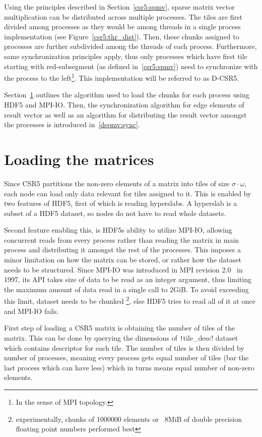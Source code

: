 \documentclass[thesis=M,english]{FITthesis}[2019/12/23]
\newcommand{\csre}[1]{\texttt!#1!}
\begin{document}
Using the principles described in Section~\ref{csr5:spmv}, sparse matrix vector multiplication can be
distributed across multiple processes. The tiles are first divided among processes as they would be
among threads in a single process implementation (see Figure~\ref{csr5:thr_dist}). Then, these chunks
assigned to processes are further subdivided among the threads of each process. Furthermore, same
synchronization principles apply, thus only processes which have first tile starting with red-subsegment
(as defined in~\ref{csr5:spmv}) need to synchronize with the process to the
left\footnote{In the sense of MPI topology.}. This implementation will be referred to as D-CSR5.

Section~\ref{dspmv:load} outlines the algorithm used to load the chunks for each process using HDF5 and
MPI-IO. Then, the synchronization algorithm for edge elements of result vector as well as an algorithm for
distributing the result vector amongst the processes is introduced in~\ref{dspmv:sync}.



\section{Loading the matrices}\label{dspmv:load}

Since CSR5 partitions the non-zero elements of a matrix into tiles of
size \(\sigma \cdot \omega\), each node can load only data relevant for tiles
assigned to it. This is enabled by two features of HDF5, first of which
is reading hyperslabs. A hyperslab is a subset of a HDF5 dataset, so
nodes do not have to read whole datasets.

Second feature enabling this, is HDF5s ability to utilize MPI-IO, allowing concurrent
reads from every process rather than reading the matrix in main process
and distributing it amongst the rest of the processes. This imposes a minor limitation
on how the matrix can be stored, or rather how the dataset needs to be structured.
Since MPI-IO was introduced in MPI revision 2.0~\cite{mpi20} in 1997, its API takes
size of data to be read as an integer argument, thus limiting the maximum amount of data read
in a single call to 2GiB. To avoid exceeding this limit, dataset needs to be chunked
\footnote{experimentally, chunks of 1000000 elements or ~8MiB of double precision floating
    point numbers performed best}, else HDF5 tries to read all of it at once and MPI-IO fails.


First step of loading a CSR5 matrix is obtaining the number of tiles of the matrix. This can be
done by querying the dimensions of \csre{tile_desc} dataset which contains descriptor for each tile.
The number of tiles is then divided by number of processes, meaning every process gets equal
number of tiles (bar the last process which can have less) which in turns means equal number
of non-zero elements.
\end{document}
